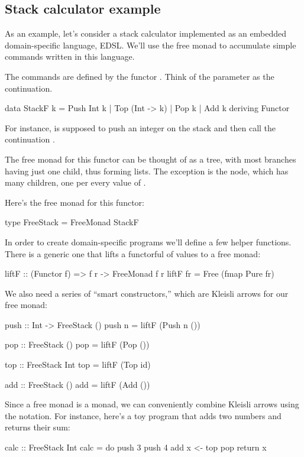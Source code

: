 \documentclass[DaoFP]{subfiles}
\begin{document}
\subsection{Stack calculator example}
As an example, let's consider a stack calculator implemented as an embedded domain-specific language, EDSL. We'll use the free monad to accumulate simple commands written in this language. 

The commands are defined by the functor . Think of the parameter   as the continuation. 
\begin{haskell}
data StackF k  = Push Int k
               | Top (Int -> k)
               | Pop k            
               | Add k
               deriving Functor
\end{haskell}
For instance,  is supposed to push an integer on the stack and then call the continuation .

The free monad for this functor can be thought of as a tree, with most branches having just one child, thus forming lists. The exception is the  node, which has many children, one per every value of .

Here's the free monad for this functor:
\begin{haskell}
type FreeStack = FreeMonad StackF
\end{haskell}

In order to create domain-specific programs we'll define a few helper functions. There is a generic one that lifts a functorful of values to a free monad:
\begin{haskell} 
liftF :: (Functor f) => f r -> FreeMonad f r
liftF fr = Free (fmap Pure fr)
\end{haskell}
We also need a series of ``smart constructors,'' which are Kleisli arrows for our free monad:
\begin{haskell}
push :: Int -> FreeStack ()
push n = liftF (Push n ())

pop :: FreeStack ()
pop = liftF (Pop ())

top :: FreeStack Int
top = liftF (Top id)

add :: FreeStack ()
add = liftF (Add ())
\end{haskell}

Since a free monad is a monad, we can conveniently combine Kleisli arrows using the  notation. For instance, here's a toy program that adds two numbers and returns their sum:
\begin{haskell}
calc :: FreeStack Int
calc = do
  push 3
  push 4
  add
  x <- top
  pop
  return x
\end{haskell}
\end{document}
